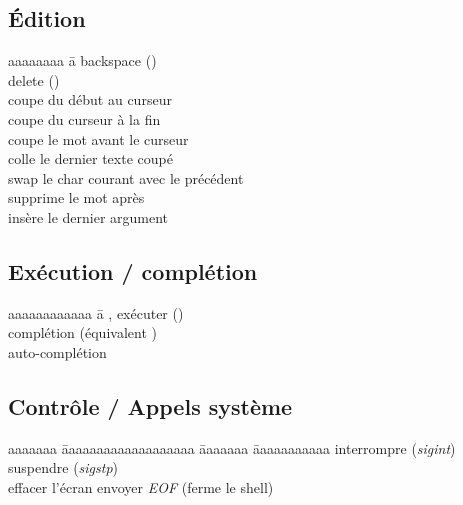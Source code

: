 \documentclass{article}
\let\oldkeys\keys
\renewcommand{\keys}[1]{\small\oldkeys{#1}\normalsize}
\begin{document}
\begin{multicols}{4}
    \subsection*{Édition}

    \begin{tabbing}
        aaaaaaaa \= a \kill
         \> backspace (\keys{\backspace})    \\
         \> delete (\keys{\del})             \\
         \> coupe du début au curseur              \\
         \> coupe du curseur à la fin              \\
         \> coupe le mot avant le curseur          \\
         \> colle le dernier texte coupé           \\
         \> swap le char courant avec le précédent \\
          \> supprime le mot après                  \\
          \> insère le dernier argument
    \end{tabbing}

    \subsection*{Exécution / complétion}

    \begin{tabbing}
        aaaaaaaaaaaa \= a \kill
        ,  exécuter (\keys{\return}) \\
         \> complétion (équivalent \keys{\tab})                           \\
        \keys{\tab}{}    \> auto-complétion
    \end{tabbing}

    \subsection*{Contrôle / Appels système}

    \begin{tabbing}
        aaaaaaa \= aaaaaaaaaaaaaaaaaaa \= aaaaaaa \= aaaaaaaaaaa \kill
         \> interrompre (\emph{sigint}) \>  \> suspendre (\emph{sigstp}) \\
         \> effacer l'écran \>
         \> envoyer \emph{EOF} (ferme le shell)
    \end{tabbing}


\end{multicols}
\end{document}
